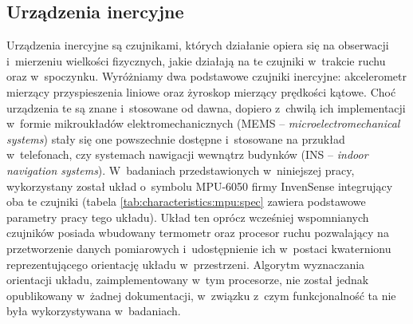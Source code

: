 																																							
																																									
\subsection{Urządzenia inercyjne}\label{sec:characteristics:imu}
																																									
Urządzenia inercyjne są czujnikami, których działanie opiera się na obserwacji i~mierzeniu wielkości fizycznych, jakie działają na te czujniki w~trakcie ruchu oraz w~spoczynku. Wyróżniamy dwa podstawowe czujniki inercyjne: akcelerometr mierzący przyspieszenia liniowe oraz żyroskop mierzący prędkości kątowe. Choć urządzenia te są znane i~stosowane od dawna, dopiero z~chwilą ich implementacji w~formie mikroukładów elektromechanicznych (MEMS -- \emph{microelectromechanical systems}) stały się one powszechnie dostępne i~stosowane na przukład w~telefonach, czy systemach nawigacji wewnątrz budynków (INS -- \emph{indoor navigation systems}). W~badaniach przedstawionych w~niniejszej pracy, wykorzystany został układ o~symbolu MPU-6050 firmy InvenSense integrujący oba te czujniki (tabela \ref{tab:characteristics:mpu:spec} zawiera podstawowe parametry pracy tego układu). Układ ten oprócz wcześniej wspomnianych czujników posiada wbudowany termometr oraz procesor ruchu pozwalający na przetworzenie danych pomiarowych i~udostępnienie ich w~postaci kwaternionu reprezentującego orientację układu w~przestrzeni. Algorytm wyznaczania orientacji układu, zaimplementowany w~tym procesorze, nie został jednak opublikowany w~żadnej dokumentacji, w~związku z~czym funkcjonalność ta nie była wykorzystywana w~badaniach.
																																									
